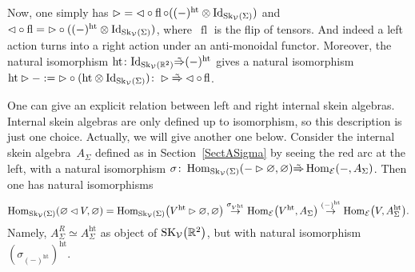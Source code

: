 \documentclass[pdftex]{sigma}%
\numberwithin{equation}{section}
\newcommand{\halft}{{\operatorname{ht}}}
\newcommand{\Hom}{\operatorname{Hom}}
\begin{document}
Now, one simply has $\rhd = \lhd \circ \operatorname{fl} \circ ((-)^\halft\otimes {\rm Id}_{{\rm Sk}_\mathcal{V}(\Sigma)})$ and $\lhd \circ \operatorname{fl} = \rhd \circ ((-)^\halft\otimes {\rm Id}_{{\rm Sk}_\mathcal{V}(\Sigma)})$, where~$\operatorname{fl}$ is the flip of tensors. And indeed a left action turns into a right action under an anti-monoidal functor. Moreover, the natural isomorphism $\halft \colon {\rm Id}_{{\rm Sk}_\mathcal{V}(\mathbb{R}^2)} \tilde{\Rightarrow} (-)^\halft$ gives a natural isomorphism $\halft \rhd - := \rhd \circ (\halft\otimes {\rm Id}_{{\rm Sk}_\mathcal{V}(\Sigma)})\colon \rhd \tilde{\Rightarrow} \lhd\circ \operatorname{fl}$.

\begin{Remark}\label{rmkASigmaRnaive}
One can give an explicit relation between left and right internal skein algebras. Internal skein algebras are only defined up to isomorphism, so this description is just one choice. Actually, we will give another one below. Consider the internal skein algebra~$A_\Sigma$ defined as in Section~\ref{SectASigma} by seeing the red arc at the left, with a natural isomorphism $\sigma \colon \Hom_{{\rm Sk}_\mathcal{V}(\Sigma)}(-\rhd \varnothing, \varnothing) \tilde{\Rightarrow} \Hom_{\mathcal{E}}(-, A_\Sigma)$. Then one has natural isomorphisms
\begin{gather*}
\Hom_{{\rm Sk}_\mathcal{V}(\Sigma)}(\varnothing \lhd V,\varnothing) = \Hom_{{\rm Sk}_\mathcal{V}(\Sigma)}\!\big(V^\halft\rhd\varnothing,\varnothing\big) \overset{\sigma_{V^\halft}}\to \Hom_\mathcal{E}\!\big(V^\halft,A_\Sigma\big) \overset{(-)^\halft}\to \Hom_\mathcal{E}\!\big(V,A_\Sigma^\halft\big).
\end{gather*}
Namely, $A_\Sigma^R \simeq A_\Sigma^\halft$ as object of ${\rm SK}_\mathcal{V}\big(\mathbb{R}^2\big)$, but with natural isomorphism $(\sigma_{(-)^\halft})^\halft$.
\end{Remark}
\end{document}
